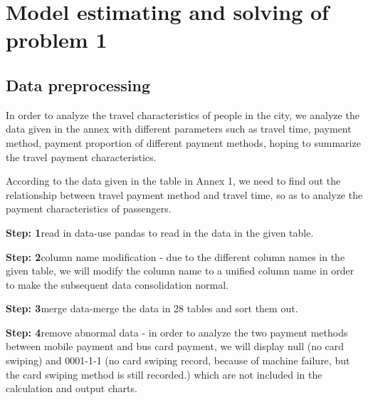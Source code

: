\documentclass[../mcmpaper]{subfiles}
\begin{document}
\section{Model estimating and solving of problem 1}
\subsection{Data preprocessing}
In order to analyze the travel characteristics of people in the city, we analyze the data given in the annex with different parameters such as travel time, payment method, payment proportion of different payment methods, hoping to summarize the travel payment characteristics.
\par
According to the data given in the table in Annex 1, we need to find out the relationship between travel payment method and travel time, so as to analyze the payment characteristics of passengers.
\par
\textbf{Step: 1}\space read in data-use pandas to read in the data in the given table.
\par
\textbf{Step: 2}\space column name modification - due to the different column names in the given table, we will modify the column name to a unified column name in order to make the subsequent data consolidation normal.
\par
\textbf{Step: 3}\space merge data-merge the data in 28 tables and sort them out.
\par
\textbf{Step: 4}\space remove abnormal data - in order to analyze the two payment methods between mobile payment and bus card payment, we will display null (no card swiping) and 0001-1-1 (no card swiping record, because of machine failure, but the card swiping method is still recorded.) which are not included in the calculation and output charts. 
\end{document}
